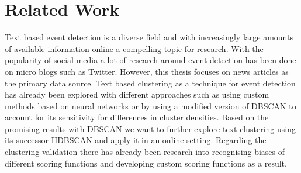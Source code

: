 \section{Related Work}

Text based event detection is a diverse field and with increasingly large amounts of available information online a compelling topic for research.
With the popularity of social media a lot of research around event detection has been done on micro blogs\cite{microblog_clustering} such as Twitter\cite{twitter_survey}\cite{social_media_survey}.
However, this thesis focuses on news articles as the primary data source.
Text based clustering as a technique for event detection has already been explored with different approaches such as using custom methods based on neural networks\cite{text_clustering_topic_detection}
or by using a modified version of DBSCAN to account for its sensitivity for differences in cluster densities\cite{dbscan_martingale}.
Based on the promising results with DBSCAN we want to further explore text clustering using its successor HDBSCAN\cite{McInnes2017} and apply it in an online setting.
Regarding the clustering validation there has already been research into recognising biases of different scoring functions \cite{Wu:2009:ARM:1557019.1557115}
and developing custom scoring functions as a result\cite{gates2017comparing}.
